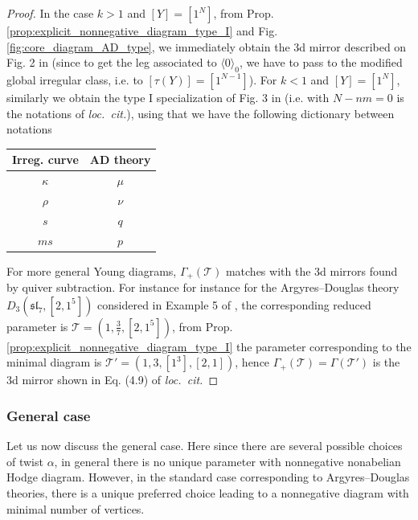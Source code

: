 \documentclass[11pt,a4paper]{amsart}
\numberwithin{equation}{section}
\newcommand{\cir}[1]{\langle #1 \rangle}
\begin{document}
\begin{proof}
In the case $k>1$ and $[Y]=[1^N]$, from Prop. \ref{prop:explicit_nonnegative_diagram_type_I} and Fig. \ref{fig:core_diagram_AD_type}, we immediately obtain the 3d mirror described on Fig. 2 in \cite{beem2025simplifying} (since to get the leg associated to $\cir{0}_0$, we have to pass to the modified global irregular class, i.e. to $[\tau(Y)]=[1^{N-1}]$).
For $k<1$ and $[Y]=[1^N]$, similarly we obtain the type I specialization of Fig. 3 in \cite{beem2025simplifying} (i.e. with $N-nm=0$ is the notations of \emph{loc.~cit.}), using that we have the following dictionary between notations

\begin{center}
\vspace{0.3cm}
\begin{tabular}{|c|c|}
\hline
Irreg. curve  & AD theory\\
\hline
$\kappa$ & $\mu$\\
\hline
$\rho$ & $\nu$\\
\hline
$s$ & $q$\\
\hline
$ms$ & $p$\\
\hline
\end{tabular}
\end{center}
For more general Young diagrams, $\Gamma_+(\mathscr T)$ matches with the 3d mirrors found by quiver subtraction. For instance for instance for the Argyres--Douglas theory $D_3(\mathfrak{sl}_7, [2, 1^5])$ considered in Example 5 of \cite{beem2025simplifying}, the corresponding reduced parameter is $\mathscr T=(1, \frac{3}{7},[2, 1^5])$, from Prop. \ref{prop:explicit_nonnegative_diagram_type_I} the parameter corresponding to the minimal diagram is $\mathcal T'=(1, 3, [1^3], [2,1])$, hence $\Gamma_+(\mathscr T)=\Gamma(\mathcal T')$ is the 3d mirror shown in Eq. (4.9) of \emph{loc.~cit.}
\end{proof}

\subsubsection{General case}

Let us now discuss the general case. Here since there are several possible choices of twist $\alpha$, in general there is no unique parameter with nonnegative nonabelian Hodge diagram. However, in the standard case corresponding to Argyres--Douglas theories, there is a unique preferred choice leading to a nonnegative diagram with minimal number of vertices. 
\end{document}
